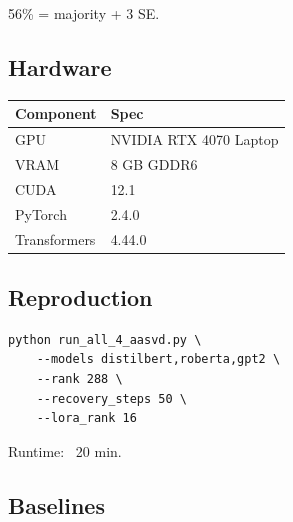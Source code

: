 56\% = majority + 3 SE.

\subsection{Hardware}

\begin{table}[H]
\centering
\small
\begin{tabular}{ll}
\toprule
\textbf{Component} & \textbf{Spec} \\
\midrule
GPU & NVIDIA RTX 4070 Laptop \\
VRAM & 8 GB GDDR6 \\
CUDA & 12.1 \\
PyTorch & 2.4.0 \\
Transformers & 4.44.0 \\
\bottomrule
\end{tabular}
\end{table}

\subsection{Reproduction}

\begin{lstlisting}
python run_all_4_aasvd.py \
    --models distilbert,roberta,gpt2 \
    --rank 288 \
    --recovery_steps 50 \
    --lora_rank 16
\end{lstlisting}

Runtime: ~20 min.

\subsection{Baselines}
